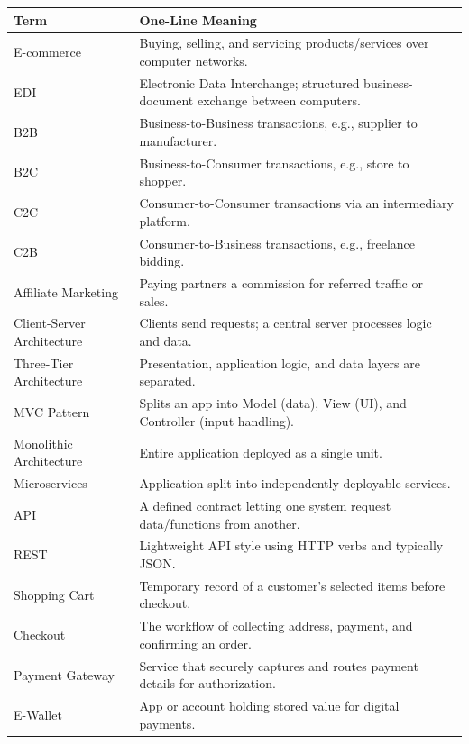 \documentclass[11pt,a4paper]{article}
\begin{document}
\begin{longtable}{@{}p{3.3cm}p{10.2cm}@{}}
\toprule
\rowcolor{primary!15}
\textbf{Term} & \textbf{One-Line Meaning} \\
\midrule
\endhead
E-commerce & Buying, selling, and servicing products/services over computer networks. \\
\addlinespace
EDI & Electronic Data Interchange; structured business-document exchange between computers. \\
\addlinespace
B2B & Business-to-Business transactions, e.g., supplier to manufacturer. \\
\addlinespace
B2C & Business-to-Consumer transactions, e.g., store to shopper. \\
\addlinespace
C2C & Consumer-to-Consumer transactions via an intermediary platform. \\
\addlinespace
C2B & Consumer-to-Business transactions, e.g., freelance bidding. \\
\addlinespace
Affiliate Marketing & Paying partners a commission for referred traffic or sales. \\
\addlinespace
Client-Server Architecture & Clients send requests; a central server processes logic and data. \\
\addlinespace
Three-Tier Architecture & Presentation, application logic, and data layers are separated. \\
\addlinespace
MVC Pattern & Splits an app into Model (data), View (UI), and Controller (input handling). \\
\addlinespace
Monolithic Architecture & Entire application deployed as a single unit. \\
\addlinespace
Microservices & Application split into independently deployable services. \\
\addlinespace
API & A defined contract letting one system request data/functions from another. \\
\addlinespace
REST & Lightweight API style using HTTP verbs and typically JSON. \\
\addlinespace
Shopping Cart & Temporary record of a customer's selected items before checkout. \\
\addlinespace
Checkout & The workflow of collecting address, payment, and confirming an order. \\
\addlinespace
Payment Gateway & Service that securely captures and routes payment details for authorization. \\
\addlinespace
E-Wallet & App or account holding stored value for digital payments. \\

\end{longtable}
\end{document}
